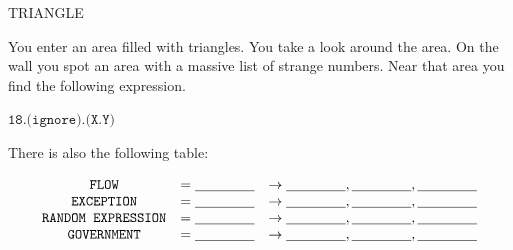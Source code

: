 \documentclass[12pt]{article}
\begin{document}
\Large

\vspace*{10px}
\begin{center}
\Huge{TRIANGLE}
\end{center}
\vspace*{10px}

\vspace{.2in}

You enter an area filled with triangles. You take a look around
the area. On the wall
you spot an area with a massive list of strange numbers. Near that area
you find the following expression.

\begin{center}
    \Large{$\texttt{18.(ignore).(X.Y)}$}
\end{center}

There is also the following table:

\[
\begin{array}{ccc}
    \texttt{FLOW} & =  \underline{\hspace{1.5cm}} & \rightarrow \underline{\hspace{1.5cm}},  \underline{\hspace{1.5cm}}, \underline{\hspace{1.5cm}} \\
    \texttt{EXCEPTION} & =  \underline{\hspace{1.5cm}} & \rightarrow \underline{\hspace{1.5cm}},  \underline{\hspace{1.5cm}}, \underline{\hspace{1.5cm}} \\
    \texttt{RANDOM EXPRESSION} & =  \underline{\hspace{1.5cm}} & \rightarrow \underline{\hspace{1.5cm}},  \underline{\hspace{1.5cm}}, \underline{\hspace{1.5cm}} \\
    \texttt{GOVERNMENT} & =  \underline{\hspace{1.5cm}} & \rightarrow \underline{\hspace{1.5cm}},  \underline{\hspace{1.5cm}}, \underline{\hspace{1.5cm}} \\
\end{array}
\]

\vspace{.15in}
\end{document}
